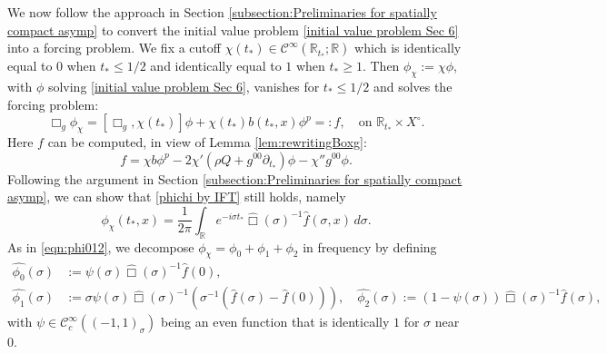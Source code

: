 \documentclass[10pt,a4paper,reqno]{amsart}
\newcommand{\CI}{\mathcal{C}^\infty}
\newcommand{\CcI}{\mathcal{C}_c^\infty}
\newcommand{\RR}{\mathbb{R}}
\newcommand{\pa}{\partial}
\theoremstyle{definition}
\theoremstyle{remark}
\numberwithin{equation}{section}
\newcommand{\R}{\mathbb R}
\newcommand{\ts}{t_*}
\newcommand{\wh}{\widehat}
\newcommand{\pats}{\pa_{t_*}}
\begin{document}
We now follow the approach in Section \ref{subsection:Preliminaries for spatially compact asymp} to convert the initial value problem \eqref{initial value problem Sec 6} into a forcing problem. We fix a cutoff $\chi(\ts)\in \CI(\RR_{\ts};\RR)$ which is identically equal to $0$ when $\ts\leq 1/2$ and identically equal to
$1$ when $\ts\geq 1$. Then $\phi_\chi := \chi\phi$, with $\phi$ solving \eqref{initial value problem Sec 6}, vanishes for $\ts\leq 1/2$ and solves the forcing problem:
\begin{equation}
\label{forcing problem Sec 6}
    \Box_g \phi_\chi = [\Box_g , \chi(\ts)]\phi + \chi(\ts) b(\ts,x)\phi^p =: f,\quad \textrm{on }\RR_{\ts}\times X^\circ.
\end{equation}
Here $f$ can be computed, in view of Lemma \ref{lem:rewritingBoxg}:
\begin{equation}
\label{the forcing f Sec 6}
    f = \chi b\phi^p - 2\chi'(\rho Q + g^{00}\pats)\phi - \chi'' g^{00} \phi. 
\end{equation}
Following the argument in Section \ref{subsection:Preliminaries for spatially compact asymp}, we can show that \eqref{phichi by IFT} still holds, namely
\[
   \phi_\chi (t_*,x) = \frac{1}{2\pi}\int_{\R} e^{-i\sigma t_*} \wh\Box(\sigma)^{-1} \widehat{f}(\sigma,x) \,d\sigma.
\]
As in \eqref{eqn:phi012}, we decompose $\phi_\chi = \phi_0 + \phi_1 + \phi_2$ in frequency by defining
\[
    \begin{split}
		\widehat{\phi_0}(\sigma) &:= \psi(\sigma)\wh\Box(\sigma)^{-1} \wh{f}(0), \\
		\widehat{\phi_1}(\sigma) &:= \sigma\psi(\sigma)\wh\Box(\sigma)^{-1}(\sigma^{-1}(\wh{f}(\sigma)-\wh{f}(0))), \quad 
		\widehat{\phi_2}(\sigma) := (1-\psi(\sigma))\wh\Box(\sigma)^{-1}\wh{f}(\sigma),
	\end{split}
\]
with $\psi\in \CcI((-1,1)_\sigma)$ being an even function that is identically $1$ for $\sigma$ near $0$.
\end{document}
